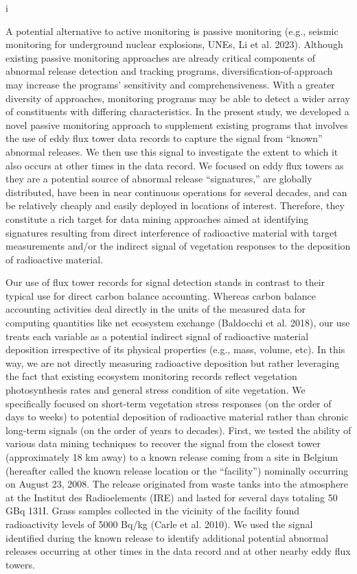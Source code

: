 i\documentclass{article}
\begin{document}
A potential alternative to active monitoring is passive monitoring (e.g., seismic monitoring for underground nuclear explosions, UNEs, Li et al. 2023). Although existing passive monitoring approaches are already critical components of abnormal release detection and tracking programs, diversification-of-approach may increase the programs' sensitivity and comprehensiveness. With a greater diversity of approaches, monitoring programs may be able to detect a wider array of constituents with differing characteristics. In the present study, we developed a novel passive monitoring approach to supplement existing programs that involves  the use of eddy flux tower data records to capture the signal from “known'' abnormal releases. We then use this signal to investigate the extent to which it also occurs at other times in the data record. We focused on eddy flux towers as they are a potential source of abnormal release “signatures,” are globally distributed, have been in near continuous operations for several decades, and can be relatively cheaply and easily deployed in locations of interest. Therefore, they constitute a rich target for data mining approaches aimed at identifying signatures resulting from direct interference of radioactive material with target measurements and/or the indirect signal of vegetation responses to the deposition of radioactive material.

Our use of flux tower records for signal detection stands in contrast to their typical use for direct carbon balance accounting. Whereas carbon balance accounting activities deal directly in the units of the measured data for computing quantities like net ecosystem exchange (Baldocchi et al. 2018), our use treats each variable as a potential indirect signal of radioactive material deposition irrespective of its physical properties (e.g., mass, volume, etc). In this way, we are not directly measuring radioactive deposition but rather leveraging the fact that existing ecosystem monitoring records reflect vegetation photosynthesis rates and general stress condition of site vegetation. We specifically focused on short-term vegetation stress responses (on the order of days to weeks) to potential deposition of radioactive material rather than chronic long-term signals (on the order of years to decades). First, we tested the ability of various data mining techniques to recover the signal from the closest tower (approximately 18 km away) to a known release coming from a site in Belgium (hereafter called the known release location or the “facility”) nominally occurring on August 23, 2008. The release originated from waste tanks into the atmosphere at the Institut des Radioelements (IRE) and lasted for several days totaling 50 GBq 131I. Grass samples collected in the vicinity of the facility found radioactivity levels of 5000 Bq/kg (Carle et al. 2010). We used the signal identified during the known release to identify additional potential abnormal releases occurring at other times in the data record and at other nearby eddy flux towers. 
\end{document}
